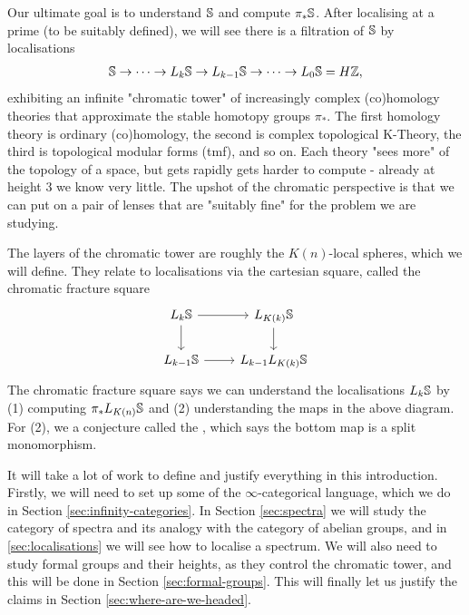 Our ultimate goal is to understand $\mathbb{S}$ and compute $\pi_*\mathbb{S}$. After localising at a prime (to be suitably defined), we will see there is a filtration of $\mathbb{S}$ by localisations
$$\mathbb{S}\rightarrow \dots\rightarrow L_k\mathbb{S}\rightarrow L_{k-1}\mathbb{S}\rightarrow \dots \rightarrow L_0\mathbb{S}=H\mathbb{Z},$$ 
exhibiting an infinite "chromatic tower" of increasingly complex (co)homology theories that approximate the stable homotopy groups $\pi_*$. The first homology theory is ordinary (co)homology, the second is complex topological K-Theory, the third is topological modular forms (tmf), and so on. Each theory "sees more" of the topology of a space, but gets rapidly gets harder to compute - already at height $3$ we know very little. The upshot of the chromatic perspective is that we can put on a pair of lenses that are "suitably fine" for the problem we are studying.

The layers of the chromatic tower are roughly the $K(n)$-local spheres, which we will define. They relate to localisations via the cartesian square, called the chromatic fracture square %
\[\begin{tikzcd}
L_k\SpecS \arrow[r] \arrow[d] & L_{K(k)}\SpecS \arrow[d] \\
L_{k-1}\SpecS \arrow[r]       & L_{k-1}L_{K(k)}\SpecS  
\end{tikzcd}\]
The chromatic fracture square says we can understand the localisations $L_k\mathbb{S}$ by (1) computing $\pi_*L_{K(n)}\mathbb{S}$ and (2) understanding the maps in the above diagram. For (2), we a conjecture called the , which says the bottom map is a split monomorphism. %

It will take a lot of work to define and justify everything in this introduction. Firstly, we will need to set up some of the $\infty$-categorical language, which we do in Section \ref{sec:infinity-categories}. In Section \ref{sec:spectra} we will study the category of spectra and its analogy with the category of abelian groups, and in \ref{sec:localisations} we will see how to localise a spectrum. We will also need to study formal groups and their heights, as they control the chromatic tower, and this will be done in Section \ref{sec:formal-groups}. This will finally let us justify the claims in Section \ref{sec:where-are-we-headed}.